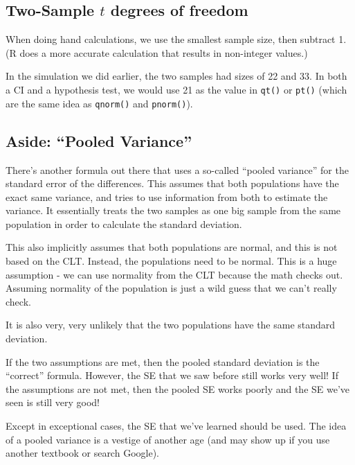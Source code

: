 \documentclass[
  letterpaper,
  DIV=11,
  numbers=noendperiod,
  oneside]{scrreprt}
\begin{document}
\hypertarget{two-sample-t-degrees-of-freedom}{%
\subsection{\texorpdfstring{Two-Sample \(t\) degrees of
freedom}{Two-Sample t degrees of freedom}}\label{two-sample-t-degrees-of-freedom}}

When doing hand calculations, we use the smallest sample size, then
subtract 1. (R does a more accurate calculation that results in
non-integer values.)

In the simulation we did earlier, the two samples had sizes of 22 and
33. In both a CI and a hypothesis test, we would use 21 as the value in
\texttt{qt()} or \texttt{pt()} (which are the same idea as
\texttt{qnorm()} and \texttt{pnorm()}).

\hypertarget{aside-pooled-variance}{%
\subsection{Aside: ``Pooled Variance''}\label{aside-pooled-variance}}

There's another formula out there that uses a so-called ``pooled
variance'' for the standard error of the differences. This assumes that
both populations have the exact same variance, and tries to use
information from both to estimate the variance. It essentially treats
the two samples as one big sample from the same population in order to
calculate the standard deviation.

This also implicitly assumes that both populations are normal, and this
is not based on the CLT. Instead, the populations need to be normal.
This is a huge assumption - we can use normality from the CLT because
the math checks out. Assuming normality of the population is just a wild
guess that we can't really check.

It is also very, very unlikely that the two populations have the same
standard deviation.

If the two assumptions are met, then the pooled standard deviation is
the ``correct'' formula. However, the SE that we saw before still works
very well! If the assumptions are not met, then the pooled SE works
poorly and the SE we've seen is still very good!

Except in exceptional cases, the SE that we've learned should be used.
The idea of a pooled variance is a vestige of another age (and may show
up if you use another textbook or search Google).
\end{document}
